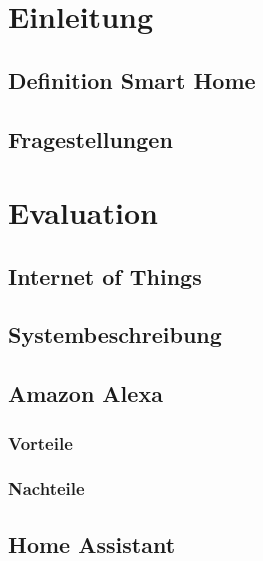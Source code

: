 \section{Einleitung}

\subsection{Definition Smart Home}
\subsection{Fragestellungen} %


\section{Evaluation}

\subsection{Internet of Things} %


\subsection{Systembeschreibung}

\subsection{Amazon Alexa}


\subsubsection{Vorteile}
\subsubsection{Nachteile}

\subsection{Home Assistant}

